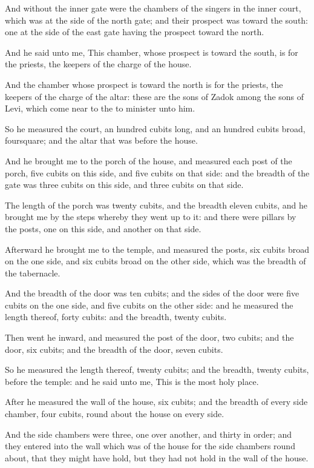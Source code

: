 \Verse And without the inner gate were the chambers of the singers in the inner court, which was at the side of the north gate; and their prospect was toward the south: one at the side of the east gate having the prospect toward the north.

\Verse And he said unto me, This chamber, whose prospect is toward the south, is for the priests, the keepers of the charge of the house.

\Verse And the chamber whose prospect is toward the north is for the priests, the keepers of the charge of the altar: these are the sons of Zadok among the sons of Levi, which come near to the \LORD to minister unto him.

\Verse So he measured the court, an hundred cubits long, and an hundred cubits broad, foursquare; and the altar that was before the house.

\Verse And he brought me to the porch of the house, and measured each post of the porch, five cubits on this side, and five cubits on that side: and the breadth of the gate was three cubits on this side, and three cubits on that side.

\Verse The length of the porch was twenty cubits, and the breadth eleven cubits, and he brought me by the steps whereby they went up to it: and there were pillars by the posts, one on this side, and another on that side.


\Chapter
\Verse Afterward he brought me to the temple, and measured the posts, six cubits broad on the one side, and six cubits broad on the other side, which was the breadth of the tabernacle.

\Verse And the breadth of the door was ten cubits; and the sides of the door were five cubits on the one side, and five cubits on the other side: and he measured the length thereof, forty cubits: and the breadth, twenty cubits.

\Verse Then went he inward, and measured the post of the door, two cubits; and the door, six cubits; and the breadth of the door, seven cubits.

\Verse So he measured the length thereof, twenty cubits; and the breadth, twenty cubits, before the temple: and he said unto me, This is the most holy place.

\Verse After he measured the wall of the house, six cubits; and the breadth of every side chamber, four cubits, round about the house on every side.

\Verse And the side chambers were three, one over another, and thirty in order; and they entered into the wall which was of the house for the side chambers round about, that they might have hold, but they had not hold in the wall of the house.

